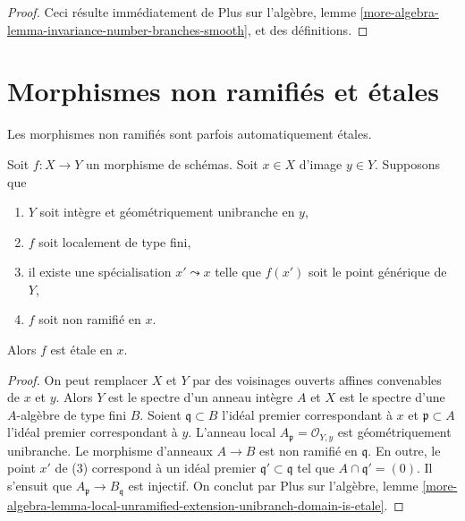 \begin{proof}
Ceci résulte immédiatement de Plus sur l'algèbre, lemme
\ref{more-algebra-lemma-invariance-number-branches-smooth},
et des définitions.
\end{proof}




\section{Morphismes non ramifiés et \'etales}
\label{section-unramified-is-etale}

\noindent
Les morphismes non ramifiés sont parfois automatiquement \'etales.

\begin{lemma}
\label{lemma-unramified-dominant-unibranch-is-etale}
Soit $f : X \to Y$ un morphisme de schémas. Soit $x \in X$
d'image $y \in Y$. Supposons que
\begin{enumerate}
\item $Y$ soit intègre et géométriquement unibranche en $y$,
\item $f$ soit localement de type fini,
\item il existe une spécialisation $x' \leadsto x$ telle que $f(x')$
soit le point générique de $Y$,
\item $f$ soit non ramifié en $x$.
\end{enumerate}
Alors $f$ est \'etale en $x$.
\end{lemma}

\begin{proof}
On peut remplacer $X$ et $Y$ par des voisinages ouverts affines convenables
de $x$ et $y$. Alors $Y$ est le spectre d'un anneau intègre $A$ et
$X$ est le spectre d'une $A$-algèbre de type fini $B$.
Soient $\mathfrak q \subset B$ l'idéal premier correspondant
à $x$ et $\mathfrak p \subset A$ l'idéal premier correspondant à $y$.
L'anneau local $A_\mathfrak p = \mathcal{O}_{Y, y}$ est géométriquement unibranche.
Le morphisme d'anneaux $A \to B$ est non ramifié en $\mathfrak q$.
En outre, le point $x'$ de (3) correspond à un idéal premier
$\mathfrak q' \subset \mathfrak q$ tel que $A \cap \mathfrak q' = (0)$.
Il s'ensuit que $A_\mathfrak p \to B_\mathfrak q$ est injectif.
On conclut par
Plus sur l'algèbre, lemme
\ref{more-algebra-lemma-local-unramified-extension-unibranch-domain-is-etale}.
\end{proof}

